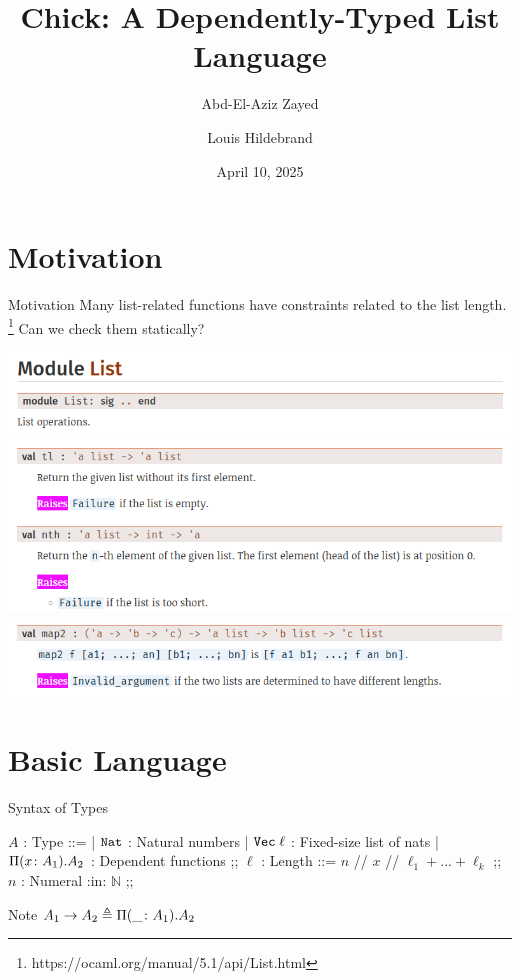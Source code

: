 \documentclass[fleqn]{beamer}
\title[Dependent Types]{Chick: A Dependently-Typed List Language}
\author[Group 8]{Abd-El-Aziz Zayed \and Louis Hildebrand}
\institute[]{McGill University}
\date[COMP 523]{April 10, 2025}
\begin{document}
\begingroup
{}
\begin{frame}[noframenumbering]
    \titlepage
\end{frame}
\endgroup

\section*{Motivation}

\begin{frame}{Motivation}
Many list-related functions have constraints related to the list length.
\footnote{https://ocaml.org/manual/5.1/api/List.html}
Can we check them statically?

\begin{center}
    \includegraphics[width=0.8\linewidth]{img/OCaml_List.png}
    \includegraphics[width=0.8\linewidth]{img/OCaml_List_tl_nth.png}
    \includegraphics[width=0.8\linewidth]{img/OCaml_List_map2.png}
\end{center}
\end{frame}

\section{Basic Language}

\begin{frame}{Syntax of Types}
\begin{center}
\begin{bnf}
    $A$ : Type ::=
        | $\texttt{Nat}$                 : Natural numbers
        | $\texttt{Vec} \; \ell$       : Fixed-size list of nats
        | $\Pi (x \colon A_1) . A_2$ : Dependent functions
        ;;
    $\ell$ : Length ::= $n$ // $x$ // $\ell_1 + ... + \ell_k$
        ;;
    $n$ : Numeral :in: $\mathbb{N}$ ;;
\end{bnf}
\end{center}

\begin{block}{Note}
    $A_1 \rightarrow A_2 \triangleq \Pi (\_ \colon A_1) . A_2$
\end{block}
\end{frame}
\end{document}
